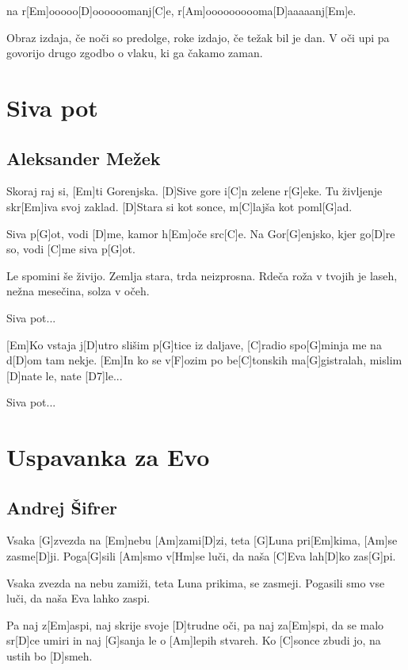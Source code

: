 \documentclass[a4paper,12pt]{article}
\begin{document}
\begin{multicols}{2}
\begin{guitar}
[Hm]na r[Em]ooooo[D]oooooomanj[C]e,
r[Am]oooooooooma[D]aaaaanj[Em]e.


Obraz izdaja, če noči so predolge,
roke izdajo, če težak bil je dan.
V oči upi pa govorijo drugo zgodbo
o vlaku, ki ga čakamo zaman.



\end{guitar}
\section{Siva pot}
\subsection*{Aleksander Mežek}
\begin{guitar}
[G]Skoraj raj si, [Em]ti Gorenjska. 
[D]Sive gore i[C]n zelene r[G]eke. 
Tu življenje skr[Em]iva svoj zaklad. 
[D]Stara si kot sonce, m[C]lajša kot poml[G]ad. 


Siva p[G]ot, vodi [D]me, 
kamor h[Em]oče src[C]e. 
Na Gor[G]enjsko, kjer go[D]re so, 
vodi [C]me siva p[G]ot. 


Le spomini še živijo. 
Zemlja stara, trda neizprosna. 
Rdeča roža v tvojih je laseh, 
nežna mesečina, solza v očeh. 


Siva pot... 


[Em]Ko vstaja j[D]utro slišim p[G]tice iz daljave, 
[C]radio spo[G]minja me na d[D]om tam nekje. 
[Em]In ko se v[F]ozim po be[C]tonskih ma[G]gistralah,
mislim [D]nate le, nate [D7]le... 


Siva pot... 

\end{guitar}
\section{Uspavanka za Evo}
\subsection*{Andrej Šifrer}
\begin{guitar}

Vsaka [G]zvezda na [Em]nebu [Am]zami[D]zi, 
teta [G]Luna pri[Em]kima, [Am]se zasme[D]ji. 
Poga[G]sili [Am]smo v[Hm]se luči, 
da naša [C]Eva lah[D]ko zas[G]pi. 


Vsaka zvezda na nebu zamiži, 
teta Luna prikima, se zasmeji. 
Pogasili smo vse luči, 
da naša Eva lahko zaspi. 


Pa naj z[Em]aspi, naj skrije svoje [D]trudne oči, 
pa naj za[Em]spi, da se malo sr[D]ce umiri 
in naj [G]sanja le o [Am]lepih stvareh. 
Ko [C]sonce zbudi jo, na ustih bo [D]smeh. 



\end{guitar}
\end{multicols}
\end{document}
